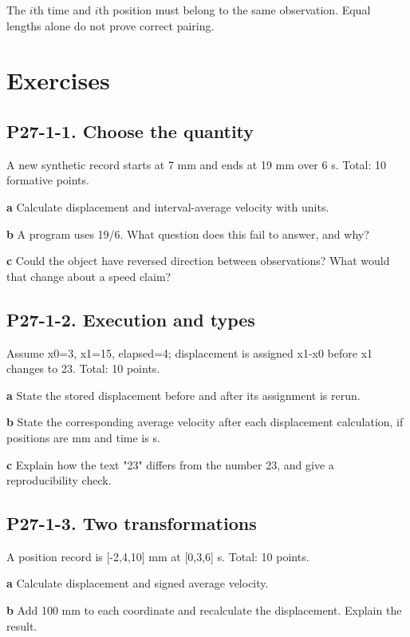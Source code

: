 \documentclass[11pt,letterpaper]{article}
\theoremstyle{definition}\newtheorem{definition}{Definition}\newtheorem{example}{Example}
\numberwithin{equation}{section}
\begin{document}
The $i$th time and $i$th position must belong to the same observation. Equal lengths alone do not prove correct pairing.
\bigskip
\section*{Exercises}
\par\noindent\begin{minipage}{\linewidth}
\subsection*{P27-1-1. Choose the quantity}
A new synthetic record starts at 7 mm and ends at 19 mm over 6 s. Total: 10 formative points.

\textbf{a} Calculate displacement and interval-average velocity with units.

\end{minipage}\par\medskip
\textbf{b} A program uses 19/6. What question does this fail to answer, and why?

\textbf{c} Could the object have reversed direction between observations? What would that change about a speed claim?

\par\noindent\begin{minipage}{\linewidth}
\subsection*{P27-1-2. Execution and types}
Assume x0=\allowbreak{}3, x1=\allowbreak{}15, elapsed=\allowbreak{}4; displacement is assigned x1-x0 before x1 changes to 23. Total: 10 points.

\textbf{a} State the stored displacement before and after its assignment is rerun.

\end{minipage}\par\medskip
\textbf{b} State the corresponding average velocity after each displacement calculation, if positions are mm and time is s.

\textbf{c} Explain how the text "23" differs from the number 23, and give a reproducibility check.

\par\noindent\begin{minipage}{\linewidth}
\subsection*{P27-1-3. Two transformations}
A position record is [-2,4,10] mm at [0,3,6] s. Total: 10 points.

\textbf{a} Calculate displacement and signed average velocity.

\end{minipage}\par\medskip
\textbf{b} Add 100 mm to each coordinate and recalculate the displacement. Explain the result.
\end{document}
